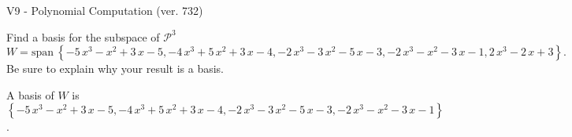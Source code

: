 \begin{exercise}
  \begin{exerciseTitle}V9 - Polynomial Computation (ver. 732)\end{exerciseTitle}
  \begin{exerciseStatement}
    Find a basis for the subspace of \(\mathcal{P}^3\) 
\[W=\mathrm{span}\ \left\{-5 \, x^{3} - x^{2} + 3 \, x - 5 , -4 \, x^{3} + 5 \, x^{2} + 3 \, x - 4 , -2 \, x^{3} - 3 \, x^{2} - 5 \, x - 3 , -2 \, x^{3} - x^{2} - 3 \, x - 1 , 2 \, x^{3} - 2 \, x + 3\right\}.\]
 Be sure to explain why your result is a basis.


  \end{exerciseStatement}
  \begin{exerciseAnswer}
   A basis of \(W\) is  \(\left\{-5 \, x^{3} - x^{2} + 3 \, x - 5 , -4 \, x^{3} + 5 \, x^{2} + 3 \, x - 4 , -2 \, x^{3} - 3 \, x^{2} - 5 \, x - 3 , -2 \, x^{3} - x^{2} - 3 \, x - 1\right\}\).
  


  \end{exerciseAnswer}
\end{exercise}